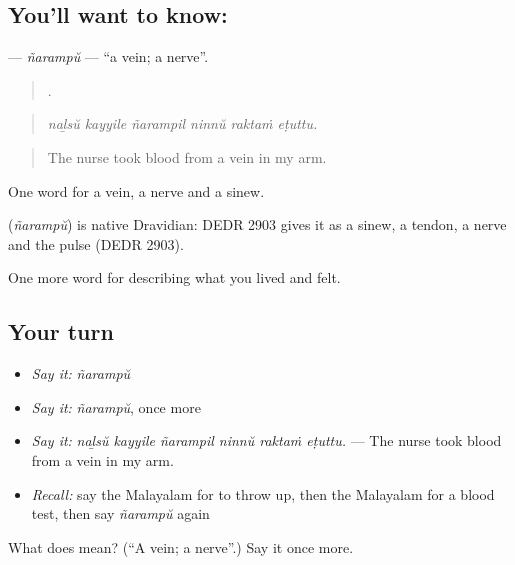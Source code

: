 \subsection*{You'll want to know: }
\textbf{} — \emph{ñarampŭ} — \textquotedblleft{}a vein; a nerve\textquotedblright{}.

\begin{quote}
     .
\end{quote}

\begin{quote}
\emph{naḻsŭ kayyile ñarampil ninnŭ raktaṁ eṭuttu.}
\end{quote}

\begin{quote}
The nurse took blood from a vein in my arm.
\end{quote}

One word for a vein, a nerve and a sinew.

\begin{cousinweb}
\textbf{} (\emph{ñarampŭ}) is native Dravidian: DEDR 2903 gives it as a sinew, a tendon, a nerve and the pulse (DEDR 2903).
\end{cousinweb}

\begin{grammarlens}[title={What you've built}]
One more word for describing what you lived and felt.
\end{grammarlens}

\subsection*{Your turn}
\begin{itemize}
\raggedright
  \item \emph{Say it:} \emph{ñarampŭ}
  \item \emph{Say it:} \emph{ñarampŭ}, once more
  \item \emph{Say it:} \emph{naḻsŭ kayyile ñarampil ninnŭ raktaṁ eṭuttu.} — The nurse took blood from a vein in my arm.
  \item \emph{Recall:} say the Malayalam for to throw up, then the Malayalam for a blood test, then say \emph{ñarampŭ} again
\end{itemize}

\begin{tcolorbox}[breakable,colback=teal!4,colframe=teal!35!black,title={Before you move on}]
What does  mean? (\textquotedblleft{}A vein; a nerve\textquotedblright{}.) Say it once more.
\end{tcolorbox}
